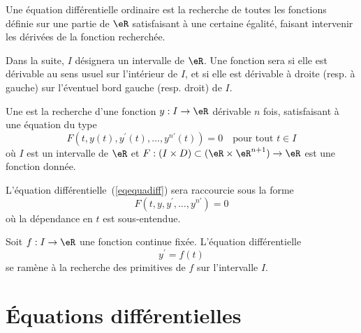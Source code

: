 

Une équation différentielle ordinaire est la recherche de toutes les fonctions définie sur une partie de $\eR$ satisfaisant à une certaine égalité, faisant intervenir les dérivées de la fonction recherchée.

Dans la suite, $I$ désignera un intervalle de $\eR$. Une fonction sera  si elle est dérivable au sens usuel sur l'intérieur de $I$, et si elle est dérivable à droite (resp. à gauche) sur l'éventuel bord gauche (resp. droit) de $I$.

\begin{definition}
  Une  est la recherche d'une fonction $y : I \to \eR$ dérivable $n$ fois, satisfaisant à une équation du type
  \begin{equation}\label{eqequadiff}
    F(t, y(t), y^\prime(t), \ldots, y^{n\prime}(t)) = 0 \quad \text{pour tout $t \in I$}
  \end{equation}
  où $I$ est un intervalle de $\eR$ et \begin{math}F : (I \times D) \subset (\eR\times\eR^{n+1})\to \eR\end{math} est une fonction donnée.
\end{definition}

\begin{remark}
L'équation différentielle~(\ref{eqequadiff}) sera raccourcie sous la forme
  \begin{equation}
    F(t, y, y^\prime, \ldots, y^{n\prime}) = 0
  \end{equation}
  où la dépendance en $t$ est sous-entendue.
\end{remark}

\begin{example}
	Soit $f : I \to \eR$ une fonction continue fixée. L'équation différentielle
	\begin{equation}
		y^\prime = f(t)
	\end{equation}
	se ramène à la recherche des primitives de $f$ sur l'intervalle $I$.
\end{example}

					\section{Équations différentielles}


